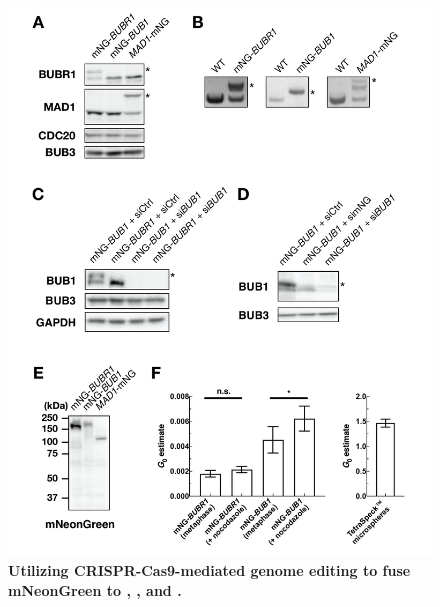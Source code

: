 \begin{figure} [b!]
    \centering
    \includegraphics[width=\textwidth]{chapters/figures/CRISPRValidation.pdf}
    \caption{\textbf{Utilizing CRISPR-Cas9-mediated genome editing to fuse mNeonGreen to , , and  .}}
    \label{CRISPRValidation}
\end{figure}
